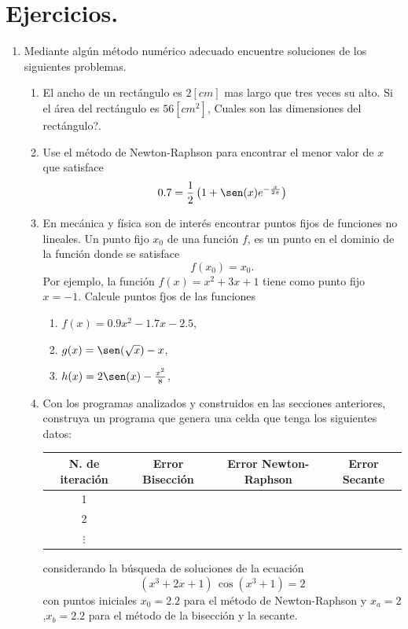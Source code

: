 \documentclass[letter,11pt]{article}
\newcommand\0{\mathbf{0}}
\begin{document}
\section{Ejercicios.}
\begin{enumerate}

\item Mediante alg\'un m\'etodo num\'erico adecuado encuentre soluciones de los siguientes problemas.
\begin{enumerate}
	\item El ancho de un rect\'angulo es $2[cm]$ mas largo que tres veces su alto. Si el \'area del rect\'angulo es $56[cm^2]$, \textquestiondown Cuales son las dimensiones del rect\'angulo?. 
    \item Use el m\'etodo de Newton-Raphson para encontrar el menor valor de $x$ que satisface
    $$
    0.7=\frac{1}{2}\left(1+\sen(x)e^{-\frac{x}{2\pi}}\right)
    $$
	\item En mec\'anica y f\'isica son de inter\'es encontrar puntos fijos de funciones no lineales. Un punto fijo $x_0$ de una funci\'on $f$, es un punto en el dominio de la funci\'on donde se satisface
    $$
    f(x_0)=x_0.
    $$
    Por ejemplo, la funci\'on $f(x)=x^2+3x+1$ tiene como punto fijo $x=-1$. Calcule puntos fjos de las funciones
    \begin{multicols}{3}
    \begin{enumerate}
    	\item $f(x)=0.9x^2-1.7x-2.5$,
        \item $g(x)=\sen(\sqrt{x})-x$,
        \item $h(x)=2\sen(x)-\frac{x^2}{8}$,
    \end{enumerate}
    \end{multicols}
    
\item Con los programas analizados y construidos en las secciones anteriores, construya un programa que genera una celda que tenga los siguientes datos:
\begin{center}
\begin{tabular}{||c|c|c|c|}
\hline
N. de iteraci\'on & Error Bisecci\'on & Error Newton-Raphson & Error Secante \\
\hline
1 	& & & \\
\hline
2 	& & & \\
\hline
$\vdots$ 	& & & \\
\hline
\end{tabular}
\end{center}
considerando la b\'usqueda de soluciones de la ecuaci\'on
$$
(x^3+2x+1)\, \cos(x^3+1)=2
$$
con puntos iniciales $x_0=2.2$ para el m\'etodo de Newton-Raphson y $x_a=2$,$x_b=2.2$ para el m\'etodo de la bisecci\'on y la secante.
    
\end{enumerate}
\end{enumerate}
\end{document}
